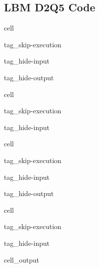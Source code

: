 \documentclass[letterpaper,10pt,english,openany,oneside]{jupyterBook}
\begin{document}
\subsection{LBM D2Q5 Code}
\label{\detokenize{LBM-Study/Poisson-Equation:lbm-d2q5-code}}
\begin{sphinxuseclass}{cell}
\begin{sphinxuseclass}{tag_skip-execution}
\begin{sphinxuseclass}{tag_hide-input}
\begin{sphinxuseclass}{tag_hide-output}
\end{sphinxuseclass}
\end{sphinxuseclass}
\end{sphinxuseclass}
\end{sphinxuseclass}
\begin{sphinxuseclass}{cell}
\begin{sphinxuseclass}{tag_skip-execution}
\begin{sphinxuseclass}{tag_hide-input}
\end{sphinxuseclass}
\end{sphinxuseclass}
\end{sphinxuseclass}
\begin{sphinxuseclass}{cell}
\begin{sphinxuseclass}{tag_skip-execution}
\begin{sphinxuseclass}{tag_hide-input}
\begin{sphinxuseclass}{tag_hide-output}
\end{sphinxuseclass}
\end{sphinxuseclass}
\end{sphinxuseclass}
\end{sphinxuseclass}
\begin{sphinxuseclass}{cell}
\begin{sphinxuseclass}{tag_skip-execution}
\begin{sphinxuseclass}{tag_hide-input}\begin{sphinxVerbatimOutput}

\begin{sphinxuseclass}{cell_output}
\noindent{}

\end{sphinxuseclass}\end{sphinxVerbatimOutput}

\end{sphinxuseclass}
\end{sphinxuseclass}
\end{sphinxuseclass}
\end{document}
